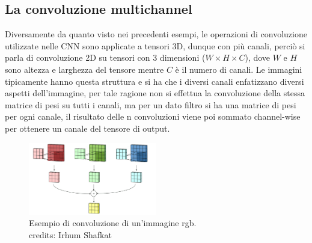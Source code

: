 \subsection{La convoluzione multichannel}
Diversamente da quanto visto nei precedenti esempi, le operazioni di convoluzione utilizzate nelle CNN sono applicate a tensori 3D, dunque con più canali,
perciò si parla di convoluzione 2D su tensori con 3 dimensioni ($W \times H \times C$), dove $W$ e $H$ sono altezza e larghezza del tensore
mentre $C$ è il numero di canali.
Le immagini tipicamente hanno questa struttura e si ha che i diversi canali enfatizzano diversi aspetti dell'immagine, per tale ragione non si effettua la convoluzione della 
stessa matrice di pesi su tutti i canali, ma per un dato filtro si ha una matrice di pesi per ogni canale, il risultato delle n convoluzioni viene poi sommato
channel-wise per ottenere un canale del tensore di output. 
    \begin{figure}[H]
        \centering
        \includegraphics[width=0.5\textwidth]{imgs/rgb_conv_sum.png}
        \caption{Esempio di convoluzione di un'immagine rgb.\\
        credits: Irhum Shafkat \cite{shafkat2018convolutional}}
        \label{fig:rgb_convolution}
    \end{figure}

